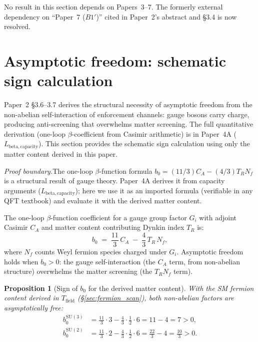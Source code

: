 \documentclass[11pt,a4paper]{article}
\newtheorem{proposition}[theorem]{Proposition}
\theoremstyle{definition}
\newcommand{\SU}{\mathrm{SU}}
\begin{document}
\smallskip\noindent No result in this section depends on Papers~3--7.
The formerly external dependency on ``Paper~7 ($B1'$)'' cited in
Paper~2's abstract and §3.4 is now resolved.


\newpage


\section{Asymptotic freedom: schematic sign calculation}
\label{sec:beta_schematic}

Paper~2 \S3.6--3.7 derives the structural necessity of asymptotic freedom
from the non-abelian self-interaction of enforcement channels: gauge
bosons carry charge, producing anti-screening that overwhelms matter
screening.  The full quantitative derivation (one-loop $\beta$-coefficient
from Casimir arithmetic) is in Paper~4A ($L_{\mathrm{beta,capacity}}$).
This section provides the schematic sign calculation using only the
matter content derived in this paper.

\textit{Proof boundary.}\quad The one-loop $\beta$-function formula
$b_0 = (11/3)C_A - (4/3)T_R N_f$ is a structural result of gauge
theory.  Paper~4A derives it from capacity arguments
($L_{\mathrm{beta,capacity}}$); here we use it as an imported formula
(verifiable in any QFT textbook) and evaluate it with the derived
matter content.

The one-loop $\beta$-function coefficient for a gauge group factor $G_i$
with adjoint Casimir $C_A$ and matter content contributing Dynkin index
$T_R$ is:
\begin{equation}
  b_0 \;=\; \frac{11}{3}\,C_A \;-\; \frac{4}{3}\,T_R\,N_f,
  \label{eq:beta_one_loop}
\end{equation}
where $N_f$ counts Weyl fermion species charged under $G_i$.
Asymptotic freedom holds when $b_0 > 0$: the gauge self-interaction
(the $C_A$ term, from non-abelian structure) overwhelms the matter
screening (the $T_R N_f$ term).

\begin{proposition}[Sign of $b_0$ for the derived matter content]
\label{prop:AF_sign}
With the SM fermion content derived in $T_{\mathrm{field}}$
(\S\ref{sec:fermion_scan}), both non-abelian factors are asymptotically
free:
\begin{align}
  b_0^{\SU(3)} &= \frac{11}{3} \cdot 3 - \frac{4}{3} \cdot \frac{1}{2} \cdot 6
    = 11 - 4 = 7 > 0, \label{eq:b0_su3} \\
  b_0^{\SU(2)} &= \frac{11}{3} \cdot 2 - \frac{4}{3} \cdot \frac{1}{2} \cdot 6
    = \frac{22}{3} - 4 = \frac{10}{3} > 0. \label{eq:b0_su2}
\end{align}
\end{proposition}
\end{document}
